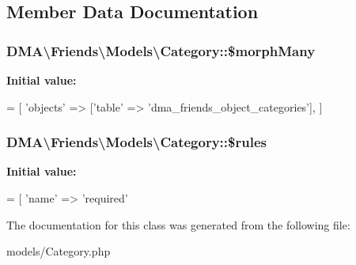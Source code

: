 \subsection{Member Data Documentation}
\hypertarget{classDMA_1_1Friends_1_1Models_1_1Category_a50575142a249c510106a75d42b71391b}{
\subsubsection[{\$morph\-Many}]{\setlength{\rightskip}{0pt plus 5cm}D\-M\-A\textbackslash{}\-Friends\textbackslash{}\-Models\textbackslash{}\-Category\-::\$morph\-Many}}\label{classDMA_1_1Friends_1_1Models_1_1Category_a50575142a249c510106a75d42b71391b}
{\bfseries Initial value\-:}
\begin{DoxyCode}
= [ 
        \textcolor{stringliteral}{'objects'} => [\textcolor{stringliteral}{'table'} => \textcolor{stringliteral}{'dma\_friends\_object\_categories'}],
    ]
\end{DoxyCode}
\hypertarget{classDMA_1_1Friends_1_1Models_1_1Category_ad99b16f55603d86e0a22fa60c22c7300}{
\subsubsection[{\$rules}]{\setlength{\rightskip}{0pt plus 5cm}D\-M\-A\textbackslash{}\-Friends\textbackslash{}\-Models\textbackslash{}\-Category\-::\$rules}}\label{classDMA_1_1Friends_1_1Models_1_1Category_ad99b16f55603d86e0a22fa60c22c7300}
{\bfseries Initial value\-:}
\begin{DoxyCode}
= [ 
        \textcolor{stringliteral}{'name'} => \textcolor{stringliteral}{'required'}
\end{DoxyCode}


The documentation for this class was generated from the following file\-:\begin{DoxyCompactItemize}
\item 
models/Category.\-php\end{DoxyCompactItemize}
